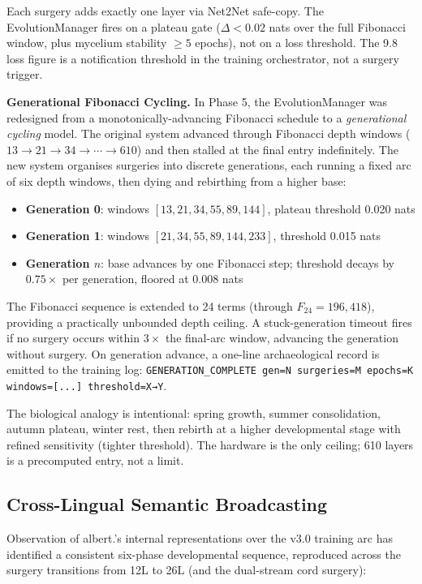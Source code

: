 \documentclass[11pt,a4paper]{article}
\begin{document}
Each surgery adds exactly one layer via Net2Net safe-copy. The EvolutionManager fires on
a plateau gate ($\Delta < 0.02$ nats over the full Fibonacci window, plus mycelium
stability $\geq 5$ epochs), not on a loss threshold. The 9.8 loss figure is a notification
threshold in the training orchestrator, not a surgery trigger.

\textbf{Generational Fibonacci Cycling.}
In Phase 5, the EvolutionManager was redesigned from a monotonically-advancing Fibonacci
schedule to a \emph{generational cycling} model. The original system advanced through
Fibonacci depth windows ($13 \to 21 \to 34 \to \cdots \to 610$) and then stalled at the
final entry indefinitely. The new system organises surgeries into discrete generations, each
running a fixed arc of six depth windows, then dying and rebirthing from a higher base:

\begin{itemize}
  \item \textbf{Generation 0}: windows $[13, 21, 34, 55, 89, 144]$, plateau threshold 0.020 nats
  \item \textbf{Generation 1}: windows $[21, 34, 55, 89, 144, 233]$, threshold 0.015 nats
  \item \textbf{Generation $n$}: base advances by one Fibonacci step; threshold decays by $0.75\times$ per generation, floored at 0.008 nats
\end{itemize}

The Fibonacci sequence is extended to 24 terms (through $F_{24} = 196{,}418$), providing
a practically unbounded depth ceiling. A stuck-generation timeout fires if no surgery occurs
within $3 \times$ the final-arc window, advancing the generation without surgery. On generation
advance, a one-line archaeological record is emitted to the training log:
\texttt{GENERATION\_COMPLETE gen=N surgeries=M epochs=K windows=[...] threshold=X→Y}.

The biological analogy is intentional: spring growth, summer consolidation, autumn plateau,
winter rest, then rebirth at a higher developmental stage with refined sensitivity (tighter
threshold). The hardware is the only ceiling; 610 layers is a precomputed entry, not a limit.

\subsection{Cross-Lingual Semantic Broadcasting}
\label{subsec:cross_lingual}

Observation of albert.'s internal representations over the v3.0 training arc has
identified a consistent six-phase developmental sequence, reproduced across the
surgery transitions from 12L to 26L (and the dual-stream cord surgery):
\end{document}
